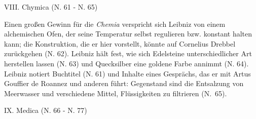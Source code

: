 \par
\vspace{3.0ex}
\noindent
VIII. Chymica (N. 61 - N. 65)
\vspace{1.0ex}
\par\noindent
Einen gro{\ss}en Gewinn für die \textit{Chemia} verspricht sich Leibniz von einem alchemischen Ofen, der seine Temperatur selbst regulieren bzw. konstant halten kann; die Konstruktion, die er hier vorstellt, könnte auf Cornelius Drebbel zurückgehen (N. 62). Leibniz hält fest, wie sich Edelsteine unterschiedlicher Art herstellen lassen (N. 63) und Quecksilber eine goldene Farbe annimmt (N. 64). Leibniz notiert Buchtitel (N. 61) und Inhalte eines Gesprächs, das er mit Artus Gouffier de Roannez und anderen führt: Gegenstand sind die Entsalzung von Meerwasser und verschiedene Mittel, Flüssigkeiten zu filtrieren (N.~65). 
\par
\vspace{3.0ex}
\noindent
IX. Medica (N. 66 - N. 77) 
\vspace{1.0ex}
\par\noindent
